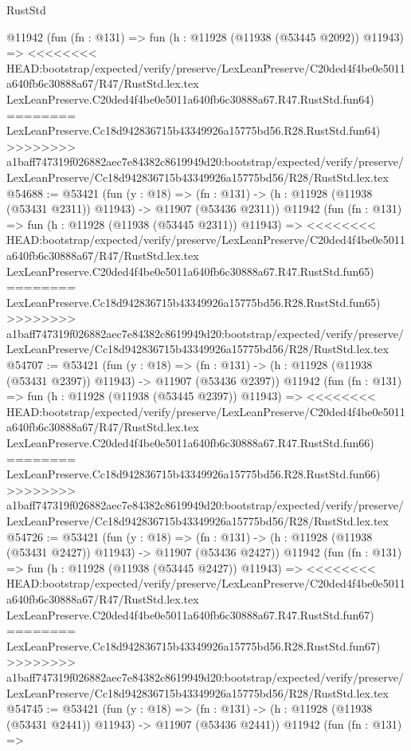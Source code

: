 \begin{lexlean}{RustStd}
\begin{coremodule}
{\begin{coremodule}
{{{{{{{{{{{{{{{{{{{{{{{{{{{{{{{{{{{{{{{{{{{{{{{{{{{{{{{{{{{{{{{{{{{{{{{{{{{{{{{{    @11942
    (fun (fn : @131) =>
    fun (h : @11928 (@11938 (@53445 @2092)) @11943) =>
<<<<<<<< HEAD:bootstrap/expected/verify/preserve/LexLeanPreserve/C20ded4f4be0e5011a640fb6c30888a67/R47/RustStd.lex.tex
    LexLeanPreserve.C20ded4f4be0e5011a640fb6c30888a67.R47.RustStd.fun64)
========
    LexLeanPreserve.Cc18d942836715b43349926a15775bd56.R28.RustStd.fun64)
>>>>>>>> a1baff747319f026882aec7e84382c8619949d20:bootstrap/expected/verify/preserve/LexLeanPreserve/Cc18d942836715b43349926a15775bd56/R28/RustStd.lex.tex
@54688 := @53421
    (fun (y : @18) =>
    (fn : @131) -> (h : @11928 (@11938 (@53431 @2311)) @11943) -> @11907 (@53436 @2311))
    @11942
    (fun (fn : @131) =>
    fun (h : @11928 (@11938 (@53445 @2311)) @11943) =>
<<<<<<<< HEAD:bootstrap/expected/verify/preserve/LexLeanPreserve/C20ded4f4be0e5011a640fb6c30888a67/R47/RustStd.lex.tex
    LexLeanPreserve.C20ded4f4be0e5011a640fb6c30888a67.R47.RustStd.fun65)
========
    LexLeanPreserve.Cc18d942836715b43349926a15775bd56.R28.RustStd.fun65)
>>>>>>>> a1baff747319f026882aec7e84382c8619949d20:bootstrap/expected/verify/preserve/LexLeanPreserve/Cc18d942836715b43349926a15775bd56/R28/RustStd.lex.tex
@54707 := @53421
    (fun (y : @18) =>
    (fn : @131) -> (h : @11928 (@11938 (@53431 @2397)) @11943) -> @11907 (@53436 @2397))
    @11942
    (fun (fn : @131) =>
    fun (h : @11928 (@11938 (@53445 @2397)) @11943) =>
<<<<<<<< HEAD:bootstrap/expected/verify/preserve/LexLeanPreserve/C20ded4f4be0e5011a640fb6c30888a67/R47/RustStd.lex.tex
    LexLeanPreserve.C20ded4f4be0e5011a640fb6c30888a67.R47.RustStd.fun66)
========
    LexLeanPreserve.Cc18d942836715b43349926a15775bd56.R28.RustStd.fun66)
>>>>>>>> a1baff747319f026882aec7e84382c8619949d20:bootstrap/expected/verify/preserve/LexLeanPreserve/Cc18d942836715b43349926a15775bd56/R28/RustStd.lex.tex
@54726 := @53421
    (fun (y : @18) =>
    (fn : @131) -> (h : @11928 (@11938 (@53431 @2427)) @11943) -> @11907 (@53436 @2427))
    @11942
    (fun (fn : @131) =>
    fun (h : @11928 (@11938 (@53445 @2427)) @11943) =>
<<<<<<<< HEAD:bootstrap/expected/verify/preserve/LexLeanPreserve/C20ded4f4be0e5011a640fb6c30888a67/R47/RustStd.lex.tex
    LexLeanPreserve.C20ded4f4be0e5011a640fb6c30888a67.R47.RustStd.fun67)
========
    LexLeanPreserve.Cc18d942836715b43349926a15775bd56.R28.RustStd.fun67)
>>>>>>>> a1baff747319f026882aec7e84382c8619949d20:bootstrap/expected/verify/preserve/LexLeanPreserve/Cc18d942836715b43349926a15775bd56/R28/RustStd.lex.tex
@54745 := @53421
    (fun (y : @18) =>
    (fn : @131) -> (h : @11928 (@11938 (@53431 @2441)) @11943) -> @11907 (@53436 @2441))
    @11942
    (fun (fn : @131) =>
}}}}}}}}}}}}}}}}}}}}}}}}}}}}}}}}}}}}}}}}}}}}}}}}}}}}}}}}}}}}}}}}}}}}}}}}}}}}}}}}
\end{coremodule}}
\end{coremodule}
\end{lexlean}
